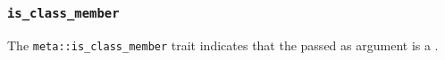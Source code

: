 
\subsubsection{\texttt{is\_class\_member}}

The \texttt{meta::is\_class\_member}
trait indicates that the  passed as argument is a .



